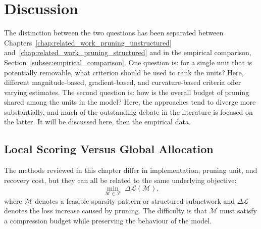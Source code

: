 ﻿%

\ifdefined\RenderPruningReviewDiscussion
\section{Discussion}
\label{sec:discussion}

The distinction between the two questions has been separated between Chapters~\ref{chap:related_work_pruning_unstructured} and~\ref{chap:related_work_pruning_structured} and in the empirical comparison, Section~\ref{subsec:empirical_comparison}. One question is: for a single unit that is potentially removable, what criterion should be used to rank the units? Here, different magnitude-based, gradient-based, and curvature-based criteria offer varying estimates. The second question is: how is the overall budget of pruning shared among the units in the model? Here, the approaches tend to diverge more substantially, and much of the outstanding debate in the literature is focused on the latter. It will be discussed here, then the empirical data.

\subsection{Local Scoring Versus Global Allocation}
\label{subsec:local_vs_global}

The methods reviewed in this chapter differ in implementation, pruning unit, and recovery cost, but they can all be related to the same underlying objective:
\begin{equation}
  \min_{\mathcal{M} \in \mathcal{F}}\; \Delta\mathcal{L}(\mathcal{M}),
  \label{eq:master}
\end{equation}
where $\mathcal{M}$ denotes a feasible sparsity pattern or structured subnetwork and $\Delta\mathcal{L}$ denotes the loss increase caused by pruning. The difficulty is that $\mathcal{M}$ must satisfy a compression budget while preserving the behaviour of the model.

